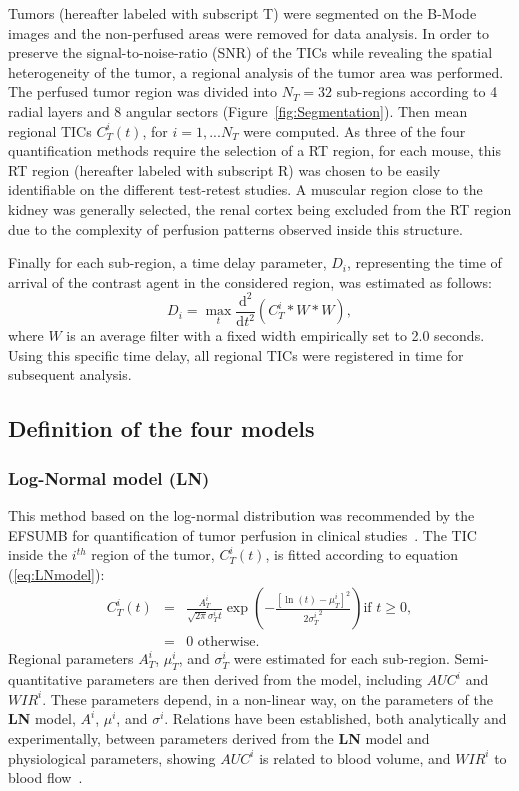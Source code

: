 Tumors (hereafter labeled with subscript T) were segmented on the B-Mode images and the non-perfused areas were removed for data analysis.
In order to preserve the signal-to-noise-ratio (SNR) of the TICs while revealing the spatial heterogeneity of the tumor, a regional analysis of the tumor area was performed. 
The perfused tumor region was divided into $N_T = 32$ sub-regions according to 4 radial layers and 8 angular sectors (Figure~\ref{fig:Segmentation}). 
Then mean regional TICs $C_T^i(t)$, for $i=1,...N_T$ were computed. 
As three of the four quantification methods require the selection of a RT region, for each mouse, this RT region (hereafter labeled with subscript R) was chosen to be easily identifiable on the different test-retest studies. 
A muscular region close to the kidney was generally selected, the renal cortex being excluded from the RT region due to the complexity of perfusion patterns observed inside this structure. 

Finally for each sub-region, a time delay parameter, $D_i$, representing the time of arrival of the contrast agent in the considered region, was estimated as follows:
\begin{equation}
D_i = \max_t \frac{\mathrm d^2}{\mathrm dt^2} (C_T^i * W * W),
\end{equation}
where $W$ is an average filter with a fixed width empirically set to 2.0 seconds. 
Using this specific time delay, all regional TICs were registered in time for subsequent analysis.

\subsection{Definition of the four models}
\subsubsection{Log-Normal model (\textbf{LN})}
This method based on the log-normal distribution was recommended by the EFSUMB for quantification of tumor perfusion in clinical studies~\cite{Dietrich:2012kw}.
The TIC inside the $i^{th}$ region of the tumor, $C_T^i(t)$, is fitted according to equation (\ref{eq:LNmodel}):
\begin{equation}
\begin{array}{rcl}
C_T^i(t) &= & \frac{A_T^i}{\sqrt{2 \pi}\sigma_T^i t} \exp \left( - \frac{\left[ \ln(t) - \mu_T^i \right]^2}{2{\sigma_T^i}^2} \right) \textrm{if } t \geq 0,\\ 
&=& \textrm{0 otherwise.}
\end{array}
\label{eq:LNmodel}
\end{equation}
Regional parameters $A_T^i$, $\mu_T^i$, and $\sigma_T^i$  were estimated for each sub-region. 
Semi-quantitative parameters are then derived from the model, including $AUC^i$ and $WIR^i$. These parameters depend, in a non-linear way, on the parameters of the \textbf{LN} model, $A^i$, $\mu^i$, and $\sigma^i$. Relations have been established, both analytically and experimentally, between parameters derived from the \textbf{LN} model and physiological parameters, showing $AUC^i$ is related to blood volume, and $WIR^i$ to blood flow~\cite{Doury:2017fz}.

